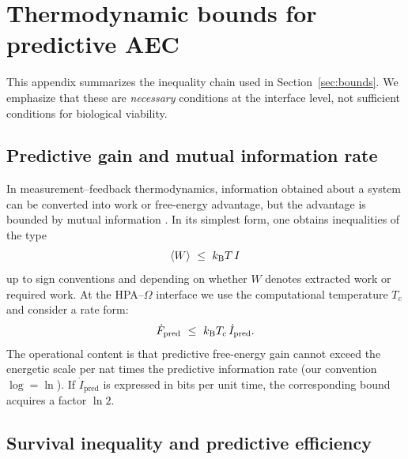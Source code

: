 \section{Thermodynamic bounds for predictive AEC}
\label{app:aec_bounds}

This appendix summarizes the inequality chain used in Section~\ref{sec:bounds}.
We emphasize that these are \emph{necessary} conditions at the interface level, not sufficient conditions for biological viability.

\subsection{Predictive gain and mutual information rate}
\label{app:Fpred_bound}

In measurement--feedback thermodynamics, information obtained about a system can be converted into work or free-energy advantage, but the advantage is bounded by mutual information \cite{SagawaUeda2010,ParrondoHorowitzSagawa2015}.
In its simplest form, one obtains inequalities of the type
\begin{equation}
  \langle W\rangle \ \le\ k_{\mathrm{B}} T\, I
\end{equation}
up to sign conventions and depending on whether $W$ denotes extracted work or required work.
At the HPA--$\Omega$ interface we use the computational temperature $T_c$ and consider a rate form:
\begin{equation}
  \dot F_{\mathrm{pred}}\ \le\ k_{\mathrm{B}} T_c\,\dot I_{\mathrm{pred}}.
\end{equation}
The operational content is that predictive free-energy gain cannot exceed the energetic scale per nat times the predictive information rate (our convention $\log=\ln$). If $\dot I_{\mathrm{pred}}$ is expressed in bits per unit time, the corresponding bound acquires a factor $\ln 2$.

\subsection{Survival inequality and predictive efficiency}
\label{app:survival}

